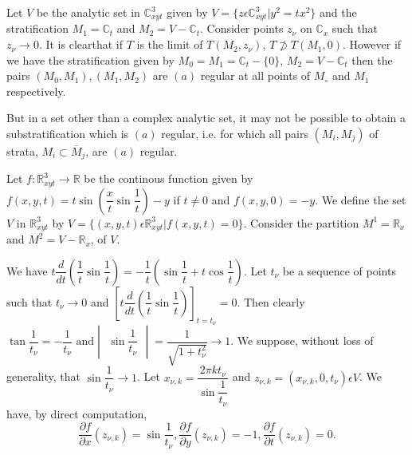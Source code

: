 \setcounter{example}{1}
\begin{example}[Whitney]\label{chap1-exam2}  %
  Let $V$  be the analytic set  in $\mathbb{C}^{3}_{xyt}$
  given by $V = \big\{z \epsilon  \mathbb{C}^{3}_{xyt} \big| y^2 =
  tx^2\big\}$ and  the stratification $M_1 =  \mathbb{C}_t$ and  $M_2
  = V - \mathbb{C}_t$. Consider points $z_\nu$ on $ \mathbb{C}_x$  such
  that $z_\nu  \rightarrow 0$. It is clear\pageoriginale that if $T$
  is the limit 
  of $T (M_2,z_\nu)$, $T \not\supset T (M_1,0)$. However if we have the
  stratification given by  
  $M_0 =  M_{1}=\mathbb{C}_{t}- \{0\}$, $M_2= V - \mathbb{C}_t$  then  the
  pairs $(M_0,M_1),  (M_1,M_2)$ are $(a)$  regular at all points of
  $M_\circ$  and $M_1$ respectively. 
\end{example}

 But in a set other than  a complex analytic set, it may not be
 possible to obtain a substratification which is $(a)$ regular, i.e.
 for which  all pairs $(M_i,M_j)$ of strata, $M_i \subset
 \overline{M}_j$,  are $(a)$  regular.  
 
 \begin{example}\label{chap1-exam3}  %
   Let  $f:\mathbb{R}^{3}_{xyt} \rightarrow \mathbb{R}$  be the
   continous function given  by $f (x,y,t) = t \sin \left(\dfrac{x}{t}\sin
   \dfrac{1}{t}\right) -y$ if  $t \neq 0$ and  $f(x,y,0) = -y$. We define
   the set $V$ in $\mathbb{R}^{3}_{xyt}$ by $V= \big\{(x,y,t)\epsilon
   \mathbb{R}^{3}_{xyt} \big|  f(x,y,t) = 0\big\}$. Consider the
   partition  $M^1 = \mathbb{R}_x$ and $M^2 = V-\mathbb{R}_x$, of
   $V$. 
 \end{example}
 
We have $t \dfrac{d}{dt} \left(\dfrac{1}{t} \sin \dfrac{1}{t}\right) =
-\dfrac{1}{t} \left(\sin \dfrac{1}{t} + t \cos \dfrac{1}{t}\right)$.  Let $t_\nu
$ be a sequence of points such that $t_\nu \rightarrow 0$ and $\left[t
  \dfrac{d}{dt} \left(\dfrac{1}{t} \sin
  \dfrac{1}{t}\right)\right]_{t=t_{\nu}} =0$. Then 
clearly $\tan \dfrac{1}{t_{\nu}} = -\dfrac{1}{t_{\nu}} \text{ and
} \begin{vmatrix} \sin \dfrac{1}{t_{\nu}} \end{vmatrix} =
\dfrac{1}{\sqrt{1+t^2_\nu}} \rightarrow 1$.   
We suppose, without  loss of generality, that $\sin \dfrac{1}{t_{\nu}}
\rightarrow 1$. Let $x_{\nu,k} = \dfrac{2\pi kt_{\nu}}{\sin
  \dfrac{1}{t_\nu}}$  and $z_{\nu,k} = (x_{\nu,k},0,t_\nu) \epsilon
V$. We have, by direct computation, 
$$
\frac{\partial f}{\partial x} (z_{\nu,k}) = \sin \frac{1}{t_{\nu}},
\frac{\partial f}{\partial y} (z_{\nu,k}) = -1, \frac{\partial
  f}{\partial t} (z_{\nu,k}) =0. 
$$

